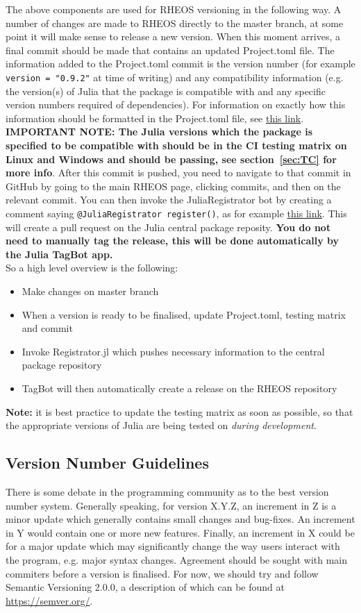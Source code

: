 \documentclass[]{article}
\newcommand{\link}[2]{{\color{blue}\href{#1}{#2}}}
\newcommand{\cod}[1]{\colorbox{light-light-gray}{\texttt{#1}}}
\begin{document}
The above components are used for RHEOS versioning in the following way. A number of changes are made to RHEOS directly to the master branch, at some point it will make sense to release a new version. When this moment arrives, a final commit should be made that contains an updated Project.toml file. The information added to the Project.toml commit is the version number (for example \cod{version = "0.9.2"} at time of writing) and any compatibility information (e.g. the version(s) of Julia that the package is compatible with and any specific version numbers required of dependencies). For information on exactly how this information should be formatted in the Project.toml file, see \link{https://julialang.github.io/Pkg.jl/v1/compatibility/index.html}{this link}. \textbf{IMPORTANT NOTE: The Julia versions which the package is specified to be compatible with should be in the CI testing matrix on Linux and Windows and should be passing, see section~\ref{sec:TC} for more info}. After this commit is pushed, you need to navigate to that commit in GitHub by going to the main RHEOS page, clicking commits, and then on the relevant commit. You can then invoke the JuliaRegistrator bot by creating a comment saying \cod{@JuliaRegistrator register()}, as for example \link{https://github.com/JuliaRheology/RHEOS.jl/commit/e2e63c299615a32ab2d7e055484b3efc662544c4}{this link}. This will create a pull request on the Julia central package reposity. \textbf{You do not need to manually tag the release, this will be done automatically by the Julia TagBot app.}\\
\newpage
So a high level overview is the following:
\begin{itemize}
	\item Make changes on master branch
	\item When a version is ready to be finalised, update Project.toml, testing matrix and commit
	\item Invoke Registrator.jl which pushes necessary information to the central package repository
	\item TagBot will then automatically create a release on the RHEOS repository
\end{itemize}

\textbf{Note:} it is best practice to update the testing matrix as soon as possible, so that the appropriate versions of Julia are being tested on \textit{during development}.
\subsection{Version Number Guidelines}
There is some debate in the programming community as to the best version number system. Generally speaking, for version X.Y.Z, an increment in Z is a minor update which generally contains small changes and bug-fixes. An increment in Y would contain one or more new features. Finally, an increment in X could be for a major update which may significantly change the way users interact with the program, e.g. major syntax changes. Agreement should be sought with main commiters before a version is finalised. For now, we should try and follow Semantic Versioning 2.0.0, a description of which can be found at \link{https://semver.org/}{https://semver.org/}.
\end{document}
